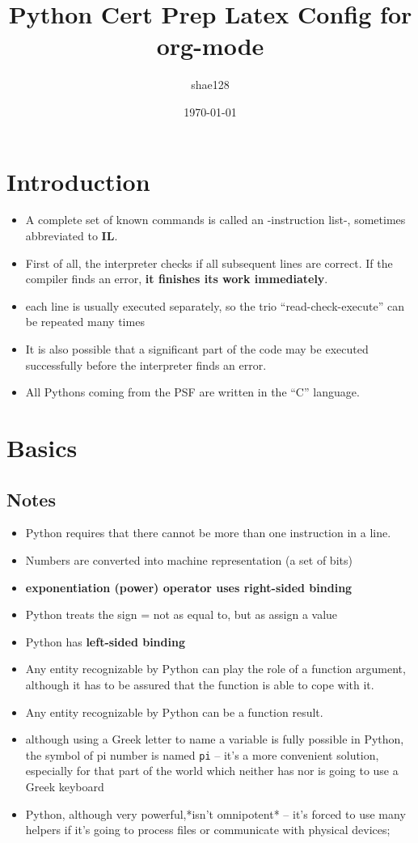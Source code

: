 \documentclass[11pt]{article}
\author{shae128}
\date{\today}
\title{Python Cert Prep Latex Config for org-mode}
\begin{document}
\maketitle
\tableofcontents

\newpage

\section{Introduction}
\label{sec:org2e10582}
\begin{itemize}
\item A complete set of known commands is called an -instruction list-,
sometimes abbreviated to \textbf{IL}.
\item First of all, the interpreter checks if all subsequent lines are
correct. If the compiler finds an error, \textbf{it finishes its work
immediately}.
\item each line is usually executed separately, so the trio
“read-check-execute” can be repeated many times
\item It is also possible that a significant part of the code may be
executed successfully before the interpreter finds an error.
\item All Pythons coming from the PSF are written in the “C” language.
\end{itemize}

\newpage
\section{Basics}
\label{sec:org10fe5ee}
\subsection{Notes}
\label{sec:org430a85d}

\begin{itemize}
\item Python requires that there cannot be more than one instruction in a line.
\item Numbers are converted into machine representation (a set of bits)
\item \textbf{exponentiation (power) operator uses right-sided binding}
\item Python treats the sign = not as equal to, but as assign a value
\item Python has \textbf{left-sided binding}
\item Any entity recognizable by Python can play the
role of a function argument, although it has to be assured that the
function is able to cope with it.
\item Any entity recognizable by Python can be a function result.
\item although using a Greek letter to name a variable is fully possible
in Python, the symbol of pi number is named \texttt{pi} – it’s a more
convenient solution, especially for that part of the world which
neither has nor is going to use a Greek keyboard
\item Python, although very powerful,*isn’t omnipotent* – it’s forced to
use many helpers if it’s going to process files or communicate with
physical devices;
\end{itemize}
\end{document}
